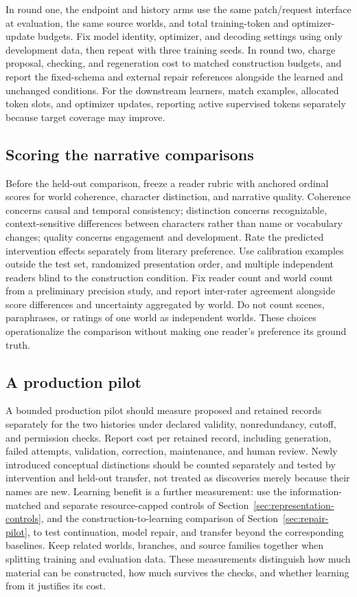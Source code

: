 \documentclass[10pt]{article}
\begin{document}
In round one, the endpoint and history arms use the same patch/request interface
at evaluation, the same source worlds, and total training-token and optimizer-update
budgets. Fix model identity, optimizer, and decoding settings using only development
data, then repeat with three training seeds. In round two, charge proposal, checking,
and regeneration cost to matched construction budgets, and report the fixed-schema
and external repair references alongside the learned and unchanged conditions. For
the downstream learners, match examples, allocated token slots, and optimizer
updates, reporting active supervised tokens separately because target coverage may
improve.

\subsection{Scoring the narrative comparisons}
\label{app:narrative-scoring}

Before the held-out comparison, freeze a reader rubric with anchored ordinal
scores for world coherence, character distinction, and narrative quality.
Coherence concerns causal and temporal consistency; distinction concerns
recognizable, context-sensitive differences between characters rather than
name or vocabulary changes; quality concerns engagement and development.
Rate the predicted intervention effects separately from literary preference.
Use calibration examples outside the test set, randomized presentation order,
and multiple independent readers blind to the construction condition. Fix
reader count and world count from a preliminary precision study, and report
inter-rater agreement alongside score differences and uncertainty aggregated
by world. Do not count scenes, paraphrases, or ratings of one world as
independent worlds. These choices operationalize the comparison without
making one reader's preference its ground truth.

\subsection{A production pilot}
\label{app:production-pilot}

A bounded production pilot should measure proposed and retained records
separately for the two histories under declared validity, nonredundancy,
cutoff, and permission checks. Report cost per retained record, including
generation, failed attempts, validation, correction, maintenance, and human
review. Newly introduced conceptual distinctions should be counted separately
and tested by intervention and held-out transfer, not treated as discoveries
merely because their names are new. Learning benefit is a further measurement:
use the information-matched and separate resource-capped controls of
Section~\ref{sec:representation-controls}, and the construction-to-learning
comparison of Section~\ref{sec:repair-pilot}, to test continuation, model repair,
and transfer beyond the corresponding baselines. Keep related worlds,
branches, and source families together when splitting training and evaluation
data. These measurements distinguish how much material can be constructed,
how much survives the checks, and whether learning from it justifies its cost.
\end{document}
